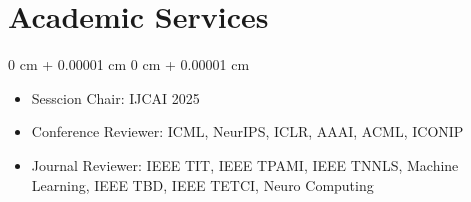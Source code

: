 \documentclass[10pt, letterpaper]{article}
\newenvironment{highlights}{
    \begin{itemize}[
        topsep=0.10 cm,
        parsep=0.10 cm,
        partopsep=0pt,
        itemsep=0pt,
        leftmargin=0 cm + 10pt
    ]
}{
    \end{itemize}
} %
\newenvironment{onecolentry}{
    \begin{adjustwidth}{
        0 cm + 0.00001 cm
    }{
        0 cm + 0.00001 cm
    }
}{
    \end{adjustwidth}
} %
\begin{document}
\section{Academic Services}
    \begin{onecolentry}
        \begin{highlights}
            \item Sesscion Chair: IJCAI 2025
            \item Conference Reviewer: ICML, NeurIPS, ICLR, AAAI, ACML, ICONIP
            \item Journal Reviewer: IEEE TIT, IEEE TPAMI, IEEE TNNLS, Machine Learning, IEEE TBD, IEEE TETCI, Neuro Computing 

        \end{highlights}
    \end{onecolentry}
        
\end{document}
